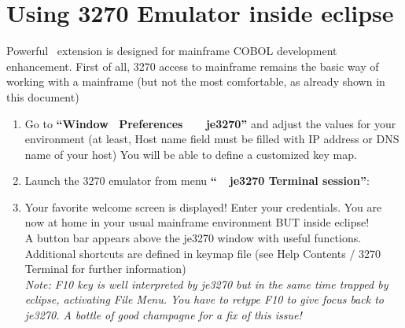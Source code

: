 \chapter{Using 3270 Emulator inside eclipse}

Powerful \mxproduct~extension is designed for mainframe COBOL development enhancement. First of all, 3270 access to mainframe remains the basic way of working with a mainframe (but not the most comfortable, as already shown in this document)

\begin{enumerate}
\item Go to \textbf{``Window \RHD~Preferences \RHD~\mxproduct~\RHD~je3270''} and adjust the values for your environment (at least, Host name field must be filled with IP address or DNS name of your host)
You will be able to define a customized key map.

\item Launch the 3270 emulator from menu \textbf{``\mxproduct~\RHD~je3270 Terminal session''}:

\item Your favorite welcome screen is displayed! Enter your credentials.
You are now at home in your usual mainframe environment BUT inside eclipse!
\\[1.5ex]
A button bar appears above the je3270 window with useful functions. Additional shortcuts are defined in keymap file (see Help Contents / 3270 Terminal for further information)
\\[2ex]
\textit{Note: F10 key is well interpreted by je3270 but in the same time trapped by eclipse, activating File Menu. You have to retype F10 to give focus back to je3270. A bottle of good champagne for a fix of this issue!}
\end{enumerate}
